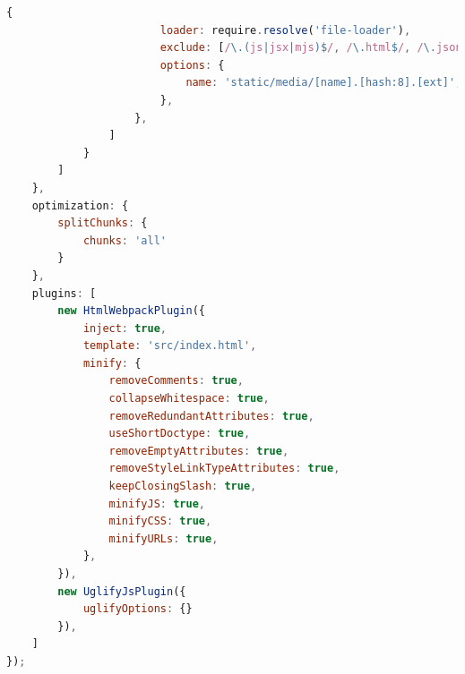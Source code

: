 \documentclass[11pt]{report}
\begin{document}
\begin{lstlisting}[language=JavaScript,label={figure:baselineConfiguration},caption={Ausgangskonfiguration für Webpack 4 (webpack.config.js)}]
                    {
                        loader: require.resolve('file-loader'),
                        exclude: [/\.(js|jsx|mjs)$/, /\.html$/, /\.json$/],
                        options: {
                            name: 'static/media/[name].[hash:8].[ext]',
                        },
                    },
                ]
            }
        ]
    },
    optimization: {
        splitChunks: {
            chunks: 'all'
        }
    },
    plugins: [
        new HtmlWebpackPlugin({
            inject: true,
            template: 'src/index.html',
            minify: {
                removeComments: true,
                collapseWhitespace: true,
                removeRedundantAttributes: true,
                useShortDoctype: true,
                removeEmptyAttributes: true,
                removeStyleLinkTypeAttributes: true,
                keepClosingSlash: true,
                minifyJS: true,
                minifyCSS: true,
                minifyURLs: true,
            },
        }),
        new UglifyJsPlugin({
            uglifyOptions: {}
        }),
    ]
});
	\end{lstlisting}

    \glsaddall
    \printglossary
    \printglossary[type=\acronymtype]


    \nocite{*}
    
\end{document}
